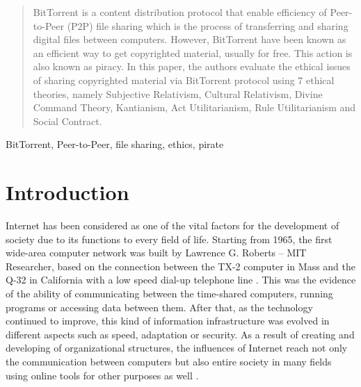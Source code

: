 \documentclass[conference]{IEEEtran}
\begin{document}
\begin{abstract}
BitTorrent is a content distribution protocol that
enable efficiency of Peer-to-Peer (P2P) file sharing which is the process of transferring and sharing
digital files between computers.
However, BitTorrent have been known as an efficient way to get copyrighted material, usually for free. This action is also known as piracy. In this paper, the authors evaluate the ethical issues of sharing copyrighted material via BitTorrent protocol using 7 ethical theories, namely Subjective Relativism, Cultural Relativism, Divine Command Theory, Kantianism, Act Utilitarianism, Rule Utilitarianism and Social Contract. 

\end{abstract}
\renewcommand\IEEEkeywordsname{Keywords}
\begin{IEEEkeywords}
BitTorrent,  Peer-to-Peer, file sharing, ethics, pirate
\end{IEEEkeywords}






%
\IEEEpeerreviewmaketitle
\section{Introduction} \label{intro}
Internet has been considered as one of the vital factors for the development of society due to its functions to every field of life. Starting from 1965, the first wide-area computer network was built by Lawrence G. Roberts – MIT Researcher, based on the connection between the TX-2 computer in Mass and the Q-32 in California with a low speed dial-up telephone line \cite{historyofinternet}. This was the evidence of the ability of communicating between the time-shared computers, running programs or accessing data between them. After that, as the technology continued to improve, this kind of information infrastructure was evolved in different aspects such as speed, adaptation or security. As a result of creating and developing of organizational structures, the influences of Internet reach not only the communication between computers but also entire society in many fields using online tools for other purposes as well \cite{historyofinternet}. 
\end{document}
